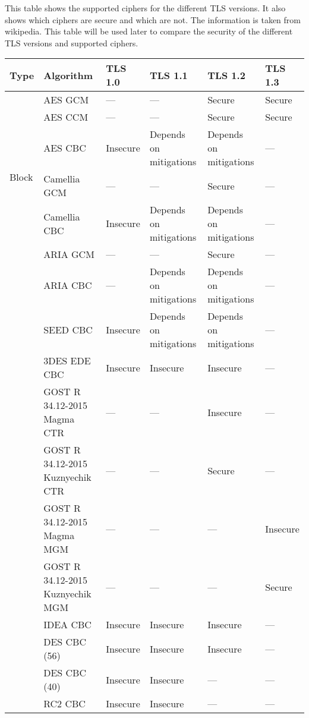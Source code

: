 \documentclass[11pt]{scrartcl} %
\begin{document}
This table shows the supported ciphers for the different TLS versions. It also shows which ciphers are secure and which are not. The information is taken from wikipedia. This table will be used later to compare the security of the different TLS versions and supported ciphers.

\begin{table}[H]
    \centering
    \renewcommand{\arraystretch}{1.3}
    \begin{tabular}{|p{2cm}|p{3cm}|p{2cm}|p{2cm}|p{2cm}|p{2cm}|}
        \hline
        \textbf{Type} & \textbf{Algorithm} & \textbf{TLS 1.0} & \textbf{TLS 1.1} & \textbf{TLS 1.2} & \textbf{TLS 1.3} \\ \hline
        
        \multirow{6}{*}{Block} & AES GCM & — & — & Secure & Secure \\ \cline{2-6}
         & AES CCM & — & — & Secure & Secure \\ \cline{2-6}
         & AES CBC & Insecure & Depends on mitigations & Depends on mitigations & — \\ \cline{2-6}
         & Camellia GCM & — & — & Secure & — \\ \cline{2-6}
         & Camellia CBC & Insecure & Depends on mitigations & Depends on mitigations & — \\ \cline{2-6}
         & ARIA GCM & — & — & Secure & — \\ \cline{2-6}
         & ARIA CBC & — & Depends on mitigations & Depends on mitigations & — \\ \cline{2-6}
         & SEED CBC & Insecure & Depends on mitigations & Depends on mitigations & — \\ \cline{2-6}
         & 3DES EDE CBC & Insecure & Insecure & Insecure & — \\ \cline{2-6}
         & GOST R 34.12-2015 Magma CTR & — & — & Insecure & — \\ \cline{2-6}
         & GOST R 34.12-2015 Kuznyechik CTR & — & — & Secure & — \\ \cline{2-6}
         & GOST R 34.12-2015 Magma MGM & — & — & — & Insecure \\ \cline{2-6}
         & GOST R 34.12-2015 Kuznyechik MGM & — & — & — & Secure \\ \cline{2-6}
         & IDEA CBC & Insecure & Insecure & Insecure & — \\ \cline{2-6}
         & DES CBC (56) & Insecure & Insecure & Insecure & — \\ \cline{2-6}
         & DES CBC (40) & Insecure & Insecure & — & — \\ \cline{2-6}
         & RC2 CBC & Insecure & Insecure & — & — \\ \hline
         

\end{tabular}
\end{table}
\end{document}
